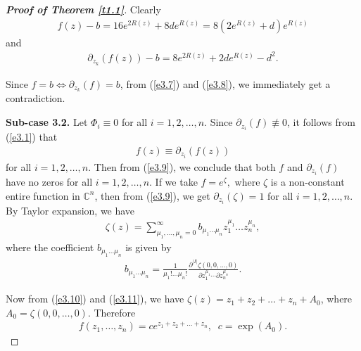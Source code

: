 \documentclass[11pt, reqno]{amsart}
\newtheorem*{cor A}{Corollary A}
\newtheorem*{cor B}{Corollary B}
\numberwithin{equation}{section}
\begin{document}
\begin{proof}[{\bf Proof of Theorem \ref{t1.1}}]
Clearly
\begin{align}\label{e3.7}
f(z)-b=16e^{2R(z)}+8de^{R(z)}=8(2e^{R(z)}+d)e^{R(z)}
\end{align}
and 
\begin{align}\label{e3.8}
\partial_{z_k}(f(z))-b=8e^{2R(z)}+2de^{R(z)}-d^2.
\end{align}

Since $f=b\Leftrightarrow \partial_{z_k}(f)=b$, from (\ref{e3.7}) and (\ref{e3.8}), we immediately get a contradiction.\par


\smallskip
{\bf Sub-case 3.2.} Let $\Phi_i\equiv 0$ for all $i=1,2,\ldots,n$. Since $\partial_{z_i}(f)\not\equiv 0$, it follows from (\ref{e3.1}) that 
\begin{align}\label{e3.9}
f(z)\equiv \partial_{z_i}(f(z))
\end{align} 
for all $i=1,2,\ldots,n$. Then from (\ref{e3.9}), we conclude that both $f$ and $\partial_{z_i}(f)$ have no zeros for all $i=1,2,\ldots,n$. If we take $f=e^{\zeta},$ where $\zeta$ is a non-constant entire function in $\mathbb{C}^n$, then from (\ref{e3.9}), we get $\partial_{z_i}(\zeta)=1$ for all $i=1,2,\ldots,n$.
By Taylor expansion, we have
\begin{align}\label{e3.10} 
\zeta(z)=\sum\limits_{\mu_1,\ldots,\mu_n=0}^{\infty} b_{\mu_1\ldots\mu_n} z_1^{\mu_1}\ldots z_n^{\mu_n},
\end{align}
where the coefficient $b_{\mu_1\ldots\mu_n}$ is given by
\begin{align}\label{e3.11} 
b_{\mu_1\ldots\mu_n}=\frac{1}{\mu_1!\ldots \mu_n!}\frac{\partial^{|I|}\zeta(0,0,\ldots,0)}{\partial z_1^{\mu_1}\cdots \partial z_n^{\mu_n}}.
\end{align}

Now from (\ref{e3.10}) and (\ref{e3.11}), we have $\zeta(z)=z_1+z_2+\ldots+z_n+A_0$, where $A_0=\zeta(0,0,\ldots,0)$. Therefore
\begin{align*}
f(z_1,\ldots,z_n)=ce^{z_1+z_2+\ldots+z_n},\;\;c=\exp(A_0).
\end{align*}
\end{proof}
\end{document}
